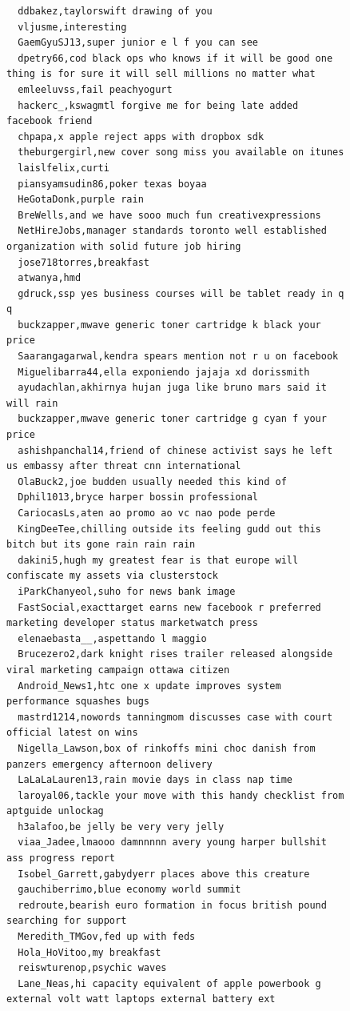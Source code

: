 \begin{figure}[htpb]
\begin{verbatim}
  ddbakez,taylorswift drawing of you
  vljusme,interesting
  GaemGyuSJ13,super junior e l f you can see
  dpetry66,cod black ops who knows if it will be good one thing is for sure it will sell millions no matter what
  emleeluvss,fail peachyogurt
  hackerc_,kswagmtl forgive me for being late added facebook friend
  chpapa,x apple reject apps with dropbox sdk
  theburgergirl,new cover song miss you available on itunes
  laislfelix,curti
  piansyamsudin86,poker texas boyaa
  HeGotaDonk,purple rain
  BreWells,and we have sooo much fun creativexpressions
  NetHireJobs,manager standards toronto well established organization with solid future job hiring
  jose718torres,breakfast
  atwanya,hmd
  gdruck,ssp yes business courses will be tablet ready in q q
  buckzapper,mwave generic toner cartridge k black your price
  Saarangagarwal,kendra spears mention not r u on facebook
  Miguelibarra44,ella exponiendo jajaja xd dorissmith
  ayudachlan,akhirnya hujan juga like bruno mars said it will rain
  buckzapper,mwave generic toner cartridge g cyan f your price
  ashishpanchal14,friend of chinese activist says he left us embassy after threat cnn international
  OlaBuck2,joe budden usually needed this kind of
  Dphil1013,bryce harper bossin professional
  CariocasLs,aten ao promo ao vc nao pode perde
  KingDeeTee,chilling outside its feeling gudd out this bitch but its gone rain rain rain
  dakini5,hugh my greatest fear is that europe will confiscate my assets via clusterstock
  iParkChanyeol,suho for news bank image
  FastSocial,exacttarget earns new facebook r preferred marketing developer status marketwatch press
  elenaebasta__,aspettando l maggio
  Brucezero2,dark knight rises trailer released alongside viral marketing campaign ottawa citizen
  Android_News1,htc one x update improves system performance squashes bugs
  mastrd1214,nowords tanningmom discusses case with court official latest on wins
  Nigella_Lawson,box of rinkoffs mini choc danish from panzers emergency afternoon delivery
  LaLaLaLauren13,rain movie days in class nap time
  laroyal06,tackle your move with this handy checklist from aptguide unlockag
  h3alafoo,be jelly be very very jelly
  viaa_Jadee,lmaooo damnnnnn avery young harper bullshit ass progress report
  Isobel_Garrett,gabydyerr places above this creature
  gauchiberrimo,blue economy world summit
  redroute,bearish euro formation in focus british pound searching for support
  Meredith_TMGov,fed up with feds
  Hola_HoVitoo,my breakfast
  reiswturenop,psychic waves
  Lane_Neas,hi capacity equivalent of apple powerbook g external volt watt laptops external battery ext

\end{verbatim}
\end{figure}
